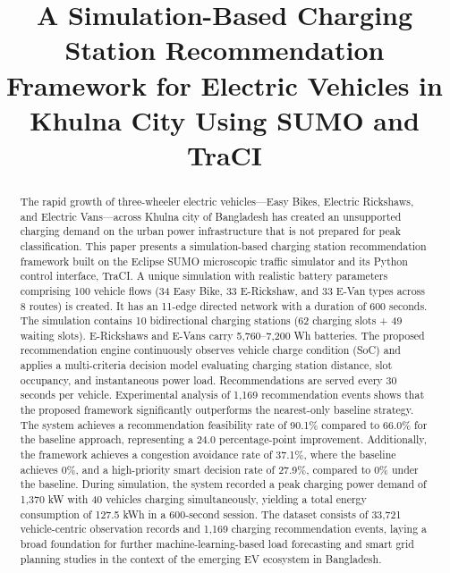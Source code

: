 \documentclass[conference]{IEEEtran}
\begin{document}
\title{A Simulation-Based Charging Station Recommendation Framework for Electric Vehicles in Khulna City Using SUMO and TraCI}

\author{
\and
{}
}

\maketitle

\begin{abstract}
The rapid growth of three-wheeler electric vehicles---Easy Bikes, Electric Rickshaws, and Electric Vans---across Khulna city of Bangladesh has created an unsupported charging demand on the urban power infrastructure that is not prepared for peak classification. This paper presents a simulation-based charging station recommendation framework built on the Eclipse SUMO microscopic traffic simulator and its Python control interface, TraCI. A unique simulation with realistic battery parameters comprising 100 vehicle flows (34 Easy Bike, 33 E-Rickshaw, and 33 E-Van types across 8 routes) is created. It has an 11-edge directed network with a duration of 600 seconds. The simulation contains 10 bidirectional charging stations (62 charging slots + 49 waiting slots). E-Rickshaws and E-Vans carry 5,760--7,200 Wh batteries. The proposed recommendation engine continuously observes vehicle charge condition (SoC) and applies a multi-criteria decision model evaluating charging station distance, slot occupancy, and instantaneous power load. Recommendations are served every 30 seconds per vehicle. Experimental analysis of 1,169 recommendation events shows that the proposed framework significantly outperforms the nearest-only baseline strategy. The system achieves a recommendation feasibility rate of 90.1\% compared to 66.0\% for the baseline approach, representing a 24.0 percentage-point improvement. Additionally, the framework achieves a congestion avoidance rate of 37.1\%, where the baseline achieves 0\%, and a high-priority smart decision rate of 27.9\%, compared to 0\% under the baseline. During simulation, the system recorded a peak charging power demand of 1,370 kW with 40 vehicles charging simultaneously, yielding a total energy consumption of 127.5 kWh in a 600-second session. The dataset consists of 33,721 vehicle-centric observation records and 1,169 charging recommendation events, laying a broad foundation for further machine-learning-based load forecasting and smart grid planning studies in the context of the emerging EV ecosystem in Bangladesh.
\end{abstract}
\end{document}
